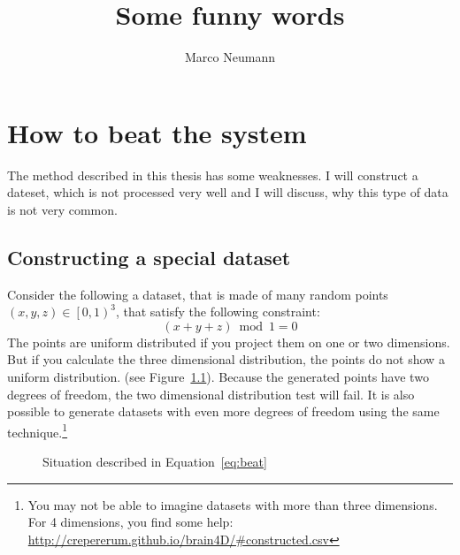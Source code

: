 \documentclass[%
	fontsize=11pt,%
	paper=a4,%
	pagesize,%
	twoside=false,%
	listof=totoc,%
	draft%
]{scrbook}
\title{Some funny words}
\author{Marco Neumann}
\begin{document}
\frontmatter
\maketitle
\tableofcontents

\mainmatter
\chapter{How to beat the system}
The method described in this thesis has some weaknesses. I will construct a dateset, which is not processed very well and I will discuss, why this type of data is not very common.

\section{Constructing a special dataset}
Consider the following a dataset, that is made of many random points $(x, y, z) \in \left[0, 1\right)^3$, that satisfy the following constraint:
\begin{equation}\label{eq:beat}
	(x + y + z) \bmod 1 = 0
\end{equation}
The points are uniform distributed if you project them on one or two dimensions. But if you calculate the three dimensional distribution, the points do not show a uniform distribution. (see Figure~\ref{fig:beat}). Because the generated points have two degrees of freedom, the two dimensional distribution test will fail. It is also possible to generate datasets with even more degrees of freedom using the same technique.\footnote{You may not be able to imagine datasets with more than three dimensions. For 4 dimensions, you find some help: \url{http://crepererum.github.io/brain4D/\#constructed.csv}}
\begin{figure}
	
	\caption{Situation described in Equation~\ref{eq:beat}}
	\label{fig:beat}
\end{figure}

\appendix

\backmatter
\listoffigures
\printglossaries
\end{document}
